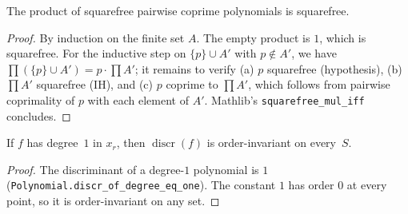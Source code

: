 \begin{lemma}
  \label{lem:prod_squarefree_of_coprime}
  \leanok
  The product of squarefree pairwise coprime polynomials is squarefree.
\end{lemma}
\begin{proof}
  \leanok
  By induction on the finite set $A$.  The empty product is $1$, which is
  squarefree.  For the inductive step on $\{p\} \cup A'$ with $p \notin A'$, we
  have $\prod (\{p\} \cup A') = p \cdot \prod A'$; it remains to verify
  (a) $p$ squarefree (hypothesis), (b) $\prod A'$ squarefree (IH), and
  (c) $p$ coprime to $\prod A'$, which follows from pairwise coprimality of $p$
  with each element of $A'$.  Mathlib's \texttt{squarefree\_mul\_iff} concludes.
\end{proof}

\begin{lemma}
  \label{lem:discr_degree_one_order_invariant}
  \leanok
  If $f$ has degree~$1$ in $x_r$, then $\operatorname{discr}(f)$ is
  order-invariant on every~$S$.
\end{lemma}
\begin{proof}
  \leanok
  The discriminant of a degree-$1$ polynomial is $1$
  (\texttt{Polynomial.discr\_of\_degree\_eq\_one}).  The constant $1$ has
  order $0$ at every point, so it is order-invariant on any set.
\end{proof}

